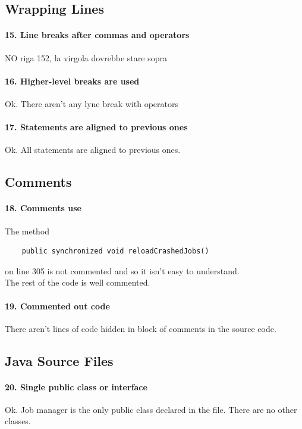 \documentclass[english]{article}
\begin{document}
\subsection{Wrapping Lines}
\paragraph{15. Line breaks after commas and operators}
NO
riga 152, la virgola dovrebbe stare sopra %

\paragraph{16. Higher-level breaks are used}
 Ok. There aren't any lyne break with operators

\paragraph{17. Statements are aligned to previous ones}
Ok. All statements are aligned to previous ones.

\subsection{Comments}

\paragraph{18. Comments use}
The method 
\begin{lstlisting} 
	public synchronized void reloadCrashedJobs() 
\end{lstlisting}

 on line 305 is not commented and so it isn't easy to understand. \\
The rest of the code is well commented.

\paragraph{19. Commented out code}
There aren't lines of code hidden in block of comments in the source code.

\subsection{Java Source Files}
\paragraph{20. Single public class or interface}
Ok.
Job manager is the only public class declared in the file.
There are no other classes.
\end{document}
